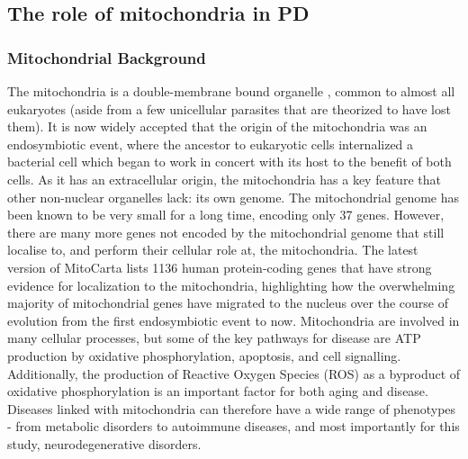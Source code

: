 \documentclass{article}
\begin{document}
\subsection{The role of mitochondria in PD}
\subsubsection{Mitochondrial Background}
The mitochondria is a double-membrane bound organelle , common to almost all eukaryotes (aside from a few unicellular parasites that are theorized to have lost them\cite{Karnkowska2016AOrganelle}). It is now widely accepted that the origin of the mitochondria was an endosymbiotic event\cite{Martin2015EndosymbioticOrigin.}, where the ancestor to eukaryotic cells internalized a bacterial cell which began to work in concert with its host to the benefit of both cells. As it has an extracellular origin, the mitochondria has a key feature that other non-nuclear organelles lack: its own genome. The mitochondrial genome has been known to be very small for a long time\cite{Taanman1999TheReplication}, encoding only 37 genes. However, there are many more genes not encoded by the mitochondrial genome that still localise to, and perform their cellular role at, the mitochondria. The latest version of MitoCarta\cite{Rath2021MitoCarta3.0:Annotations} lists 1136 human protein-coding genes that have strong evidence for localization to the mitochondria, highlighting how the overwhelming majority of mitochondrial genes have migrated to the nucleus over the course of evolution from the first endosymbiotic event to now.
Mitochondria are involved in many cellular processes, but some of the key pathways for disease are ATP production by oxidative phosphorylation, apoptosis, and cell signalling\cite{Rossmann2021MitochondrialDisease}. Additionally, the production of Reactive Oxygen Species (ROS) as a byproduct of oxidative phosphorylation is an important factor for both aging and disease\cite{Brieger2012ReactiveDisease}. Diseases linked with mitochondria can therefore have a wide range of phenotypes - from metabolic disorders\cite{Bhatti2017MitochondrialStrategies} to autoimmune diseases\cite{Xu2020EmergingDiseases}, and most importantly for this study, neurodegenerative disorders\cite{MonzioCompagnoni2020TheDisease}.
\end{document}
